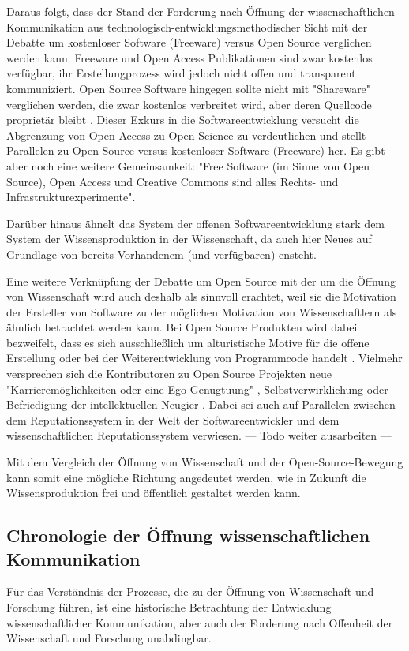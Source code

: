 Daraus folgt, dass der Stand der Forderung nach Öffnung der wissenschaftlichen Kommunikation aus technologisch-entwicklungsmethodischer Sicht mit der Debatte um kostenloser Software (Freeware) versus Open Source verglichen werden kann. Freeware und Open Access Publikationen sind zwar kostenlos verfügbar, ihr Erstellungprozess wird jedoch nicht offen und transparent kommuniziert. Open Source Software hingegen sollte nicht mit "Shareware" verglichen werden, die zwar kostenlos verbreitet wird, aber deren Quellcode proprietär bleibt \cite{Lerner_2001} . Dieser Exkurs in die Softwareentwicklung versucht die Abgrenzung von Open Access zu Open Science zu verdeutlichen und stellt Parallelen zu Open Source versus kostenloser Software (Freeware) her. Es gibt aber noch eine  weitere Gemeinsamkeit: "Free Software (im Sinne von Open Source), Open Access und Creative Commons sind alles Rechts- und Infrastrukturexperimente"\cite{kelty_2004}.

Darüber hinaus ähnelt das System der offenen Softwareentwicklung stark dem System der Wissensproduktion in der Wissenschaft, da auch hier Neues auf Grundlage von bereits Vorhandenem (und verfügbaren) ensteht.

Eine weitere Verknüpfung der Debatte um Open Source mit der um die Öffnung von Wissenschaft wird auch deshalb als sinnvoll erachtet, weil sie die Motivation der Ersteller von Software zu der möglichen Motivation von Wissenschaftlern als ähnlich betrachtet werden kann. Bei Open Source Produkten wird dabei bezweifelt, dass es sich ausschließlich um alturistische Motive für die offene Erstellung oder bei der Weiterentwicklung von Programmcode handelt \cite{Lerner_2001}. Vielmehr versprechen sich die Kontributoren zu Open Source Projekten neue "Karrieremöglichkeiten oder eine Ego-Genugtuung" \cite{Lerner_2001}, Selbstverwirklichung oder Befriedigung der intellektuellen Neugier \cite{Willinsky_2005}. Dabei sei auch auf Parallelen zwischen dem Reputationssystem in der Welt der Softwareentwickler und dem wissenschaftlichen Reputationssystem verwiesen.  --- Todo weiter ausarbeiten ---

Mit dem Vergleich der Öffnung von Wissenschaft und der Open-Source-Bewegung kann somit eine mögliche Richtung angedeutet werden\cite{Kuhlen_2002_universalaccess}, wie in Zukunft die Wissensproduktion frei und öffentlich gestaltet werden kann.

\subsection{Chronologie der Öffnung wissenschaftlichen Kommunikation}
Für das Verständnis der Prozesse, die zu der Öffnung von Wissenschaft und Forschung führen, ist eine historische Betrachtung der Entwicklung wissenschaftlicher Kommunikation, aber auch der Forderung nach Offenheit der Wissenschaft und Forschung unabdingbar.

